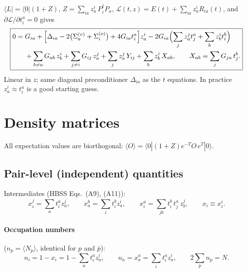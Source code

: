 \documentclass[11pt,a4paper]{article}
\newcommand{\kb}[1]{\bar{#1}}                 %
\newcommand{\Pd}[1]{P^{\dagger}_{#1}}
\newcommand{\Pa}[1]{P_{#1}}
\newcommand{\ev}[1]{\langle #1 \rangle}
\begin{document}
$\langle L|=\langle 0|(1+Z)$, $Z=\sum_{ia}z^i_a\,\Pd i\Pa a$,
$\mathcal L(t,z)=E(t)+\sum_{ia}z^i_a R_{ia}(t)$, and $\partial\mathcal L/\partial t^a_i=0$ gives
\begin{equation}
  \boxed{
  \begin{aligned}
  0=\;& G_{ia}+\Bigl[\Delta_{ia}-2\bigl(\Sigma^{(v)}_a+\Sigma^{(o)}_i\bigr)+4G_{ia}t^a_i\Bigr]z^i_a
       -2G_{ia}\Bigl(\sum_j z^j_a t^a_j+\sum_b z^i_b t^b_i\Bigr)\\
      &+\sum_{b\neq a}G_{ab}\,z^i_b+\sum_{j\neq i}G_{ij}\,z^j_a
       +\sum_{j}z^j_a\,Y_{ij}+\sum_{b}z^i_b\,X_{ab},
       \qquad X_{ab}=\sum_j G_{ja}\,t^b_j .
  \end{aligned}}
  \label{eq:zamp}
\end{equation}
Linear in $z$; same diagonal preconditioner $\Delta_{ia}$ as the $t$ equations.
In practice $z^i_a\approx t^a_i$ is a good starting guess.

\section{Density matrices}

All expectation values are biorthogonal:
$\ev{O}=\langle 0|(1+Z)e^{-T}O\,e^{T}|0\rangle$.

\subsection{Pair-level (independent) quantities}

Intermediates (HBSS Eqs.~(A9), (A11)):
\begin{equation}
  x^j_i=\sum_a t^a_i z^j_a,\qquad x^b_a=\sum_i t^b_i z^i_a,\qquad
  x^a_i=\sum_{jb}t^b_i\,t^a_j\,z^j_b,\qquad x_i\equiv x^i_i .
\end{equation}

\paragraph{Occupation numbers} ($n_p=\ev{N_p}$, identical for $p$ and $\kb p$):
\begin{equation}
  \boxed{\;n_i=1-x_i=1-\sum_a t^a_i z^i_a,\qquad n_a=x^a_a=\sum_i t^a_i z^i_a,\qquad
  2\sum_p n_p=N .\;}
\end{equation}
\end{document}

